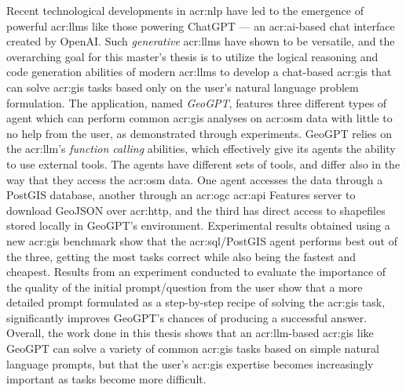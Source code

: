 Recent technological developments in \acrlong{acr:nlp} have led to the emergence of powerful \glspl{acr:llm} like those powering ChatGPT --- an \acrshort{acr:ai}-based chat interface created by OpenAI. Such \textit{generative} \glspl{acr:llm} have shown to be versatile, and the overarching goal for this master's thesis is to utilize the logical reasoning and code generation abilities of modern \glspl{acr:llm} to develop a chat-based \acrshort{acr:gis} that can solve \acrshort{acr:gis} tasks based only on the user's natural language problem formulation. The application, named \textit{GeoGPT}, features three different types of agent which can perform common \acrshort{acr:gis} analyses on \gls{acr:osm} data with little to no help from the user, as demonstrated through experiments. GeoGPT relies on the \acrshort{acr:llm}'s \textit{function calling} abilities, which effectively give its agents the ability to use external tools. The agents have different sets of tools, and differ also in the way that they access the \gls{acr:osm} data. One agent accesses the data through a PostGIS database, another through an \acrshort{acr:ogc} \acrshort{acr:api} Features server to download GeoJSON over \acrshort{acr:http}, and the third has direct access to shapefiles stored locally in GeoGPT's environment. Experimental results obtained using a new \acrshort{acr:gis} benchmark show that the \acrshort{acr:sql}/PostGIS agent performs best out of the three, getting the most tasks correct while also being the fastest and cheapest. Results from an experiment conducted to evaluate the importance of the quality of the initial prompt/question from the user show that a more detailed prompt formulated as a step-by-step recipe of solving the \acrshort{acr:gis} task, significantly improves GeoGPT's chances of producing a successful answer. Overall, the work done in this thesis shows that an \acrshort{acr:llm}-based \acrshort{acr:gis} like GeoGPT can solve a variety of common \acrshort{acr:gis} tasks based on simple natural language prompts, but that the user's \acrshort{acr:gis} expertise becomes increasingly important as tasks become more difficult.


\glsresetall
